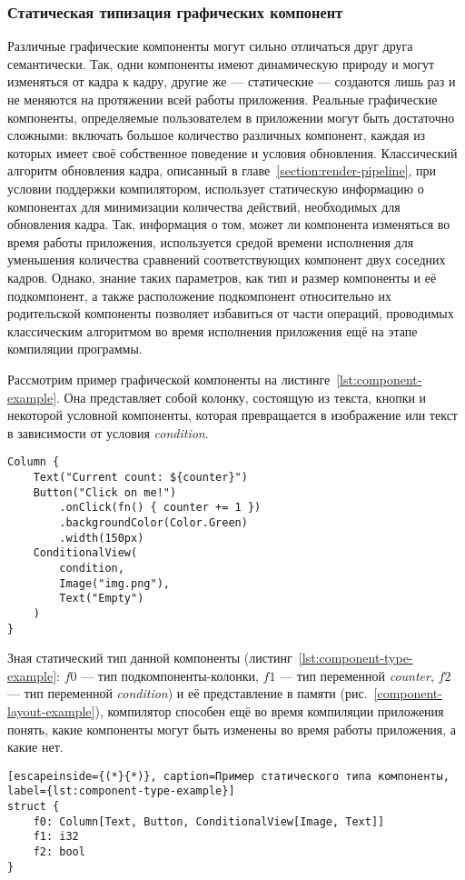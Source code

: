 \subsubsection{Статическая типизация графических компонент}
Различные графические компоненты могут сильно отличаться друг друга
семантически. Так, одни компоненты имеют динамическую
природу и могут изменяться от кадра к кадру, другие же --- статические ---
создаются лишь раз и не меняются на протяжении всей работы приложения.
Реальные графические компоненты, определяемые пользователем в приложении
могут быть достаточно сложными: включать большое количество различных
компонент, каждая из которых имеет своё собственное поведение и условия
обновления. Классический алгоритм обновления кадра, описанный
в главе~\ref{section:render-pipeline}, при условии поддержки компилятором,
использует статическую информацию о компонентах для минимизации
количества действий, необходимых для обновления кадра. Так, информация о
том, может ли компонента изменяться во время работы приложения, используется
средой времени исполнения для уменьшения количества сравнений
соответствующих компонент двух соседних кадров. Однако, знание таких
параметров, как тип и размер компоненты и её подкомпонент, а также
расположение подкомпонент относительно их родительской компоненты позволяет
избавиться от части операций, проводимых классическим алгоритмом во время
исполнения приложения ещё на этапе компиляции программы.

Рассмотрим пример графической компоненты на
листинге~\ref{lst:component-example}. Она представляет собой колонку,
состоящую из текста, кнопки и некоторой условной компоненты, которая
превращается в изображение или текст в зависимости от условия
\textit{condition}.
\begin{lstlisting}[language=my_pseudo, caption=Пример графической компоненты, label={lst:component-example}]
Column {
    Text("Current count: ${counter}")
    Button("Click on me!")
        .onClick(fn() { counter += 1 })
        .backgroundColor(Color.Green)
        .width(150px)
    ConditionalView(
        condition,
        Image("img.png"),
        Text("Empty")
    )
}
\end{lstlisting}
Зная статический тип данной компоненты
(листинг~\ref{lst:component-type-example}: $f0$ --- тип
под\-ком\-по\-ненты-колонки, $f1$ --- тип переменной \textit{counter}, $f2$
--- тип переменной \textit{condition}) и её представление в памяти
(рис.~\ref{component-layout-example}), компилятор способен ещё во время
компиляции приложения понять, какие компоненты могут быть изменены
во время работы приложения, а какие нет.
\begin{lstlisting}[escapeinside={(*}{*)}, caption=Пример статического типа компоненты, label={lst:component-type-example}]
struct {
    f0: Column[Text, Button, ConditionalView[Image, Text]]
    f1: i32
    f2: bool
}
\end{lstlisting}

